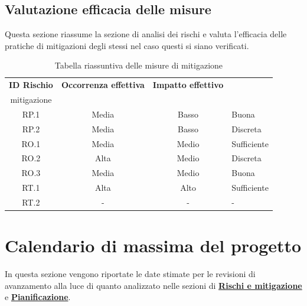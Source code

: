 \documentclass[10pt, a4paper]{article}
\begin{document}
{{{{{\subsection{Valutazione efficacia delle misure}
Questa sezione riassume la sezione di analisi dei rischi e valuta l'efficacia delle pratiche di mitigazioni degli stessi nel caso questi si siano verificati.\\
{\renewcommand{\arraystretch}{1.5}
\begin{table}[H]
\begin{tabularx}{\textwidth}{c|c|c|X}
\textbf{ID Rischio} & \textbf{Occorrenza effettiva} & \textbf{Impatto effettivo} & \textbf{\quantities{Efficacia misure di \\mitigazione}} \\
\hline
RP.1 & Media & Basso & Buona\\
\hline
RP.2 & Media & Basso & Discreta \\
\hline
RO.1 & Media & Medio & Sufficiente\\
\hline
RO.2 & Alta & Medio & Discreta\\
\hline
RO.3 & Media & Medio & Buona\\
\hline
RT.1 & Alta & Alto & Sufficiente\\
\hline
RT.2 & - & - & -\\


\end{tabularx}
\caption{Tabella riassuntiva delle misure di mitigazione}
\end{table}

\newpage
\section{Calendario di massima del progetto}
In questa sezione vengono riportate le date stimate per le revisioni di avanzamento alla luce di quanto analizzato nelle sezioni di \hyperref[section:Rischi]{\textbf{Rischi e mitigazione}} e \hyperref[section:Pianificazione]{\textbf{Pianificazione}}.

}}}}}}
\end{document}
